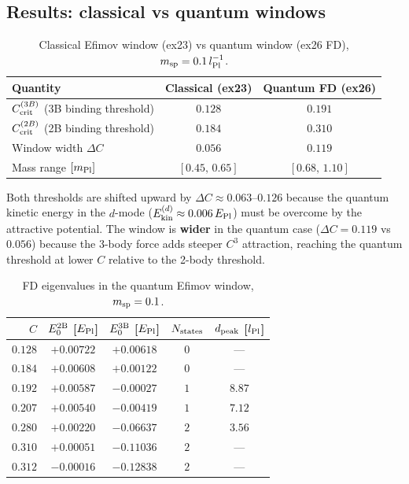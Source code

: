 \subsection{Results: classical vs quantum windows}

\begin{table}[h]
\centering
\caption{Classical Efimov window (ex23) vs quantum window (ex26 FD),
$m_{\rm sp}=0.1\,l_{\rm Pl}^{-1}$.}
\label{tab:qm_window}
\begin{tabular}{lcc}
\hline
Quantity & Classical (ex23) & Quantum FD (ex26) \\
\hline
$C_{\rm crit}^{(3B)}$ (3B binding threshold) & $0.128$ & $0.191$ \\
$C_{\rm crit}^{(2B)}$ (2B binding threshold) & $0.184$ & $0.310$ \\
Window width $\Delta C$ & $0.056$ & $\mathbf{0.119}$ \\
Mass range $[m_{\rm Pl}]$ & $[0.45,\,0.65]$ & $[0.68,\,1.10]$ \\
\hline
\end{tabular}
\end{table}

\noindent
Both thresholds are shifted upward by $\Delta C\approx0.063$--$0.126$
because the quantum kinetic energy in the $d$-mode
($E_{\rm kin}^{(d)}\approx0.006\,E_{\rm Pl}$) must be overcome by the
attractive potential.  The window is \textbf{wider} in the quantum case
($\Delta C=0.119$ vs $0.056$) because the 3-body force adds steeper
$C^3$ attraction, reaching the quantum threshold at lower $C$ relative
to the 2-body threshold.

\begin{table}[h]
\centering
\caption{FD eigenvalues in the quantum Efimov window, $m_{\rm sp}=0.1$.}
\label{tab:qm_eigs}
\begin{tabular}{rcccc}
\hline
$C$ & $E_0^{\rm 2B}$ [$E_{\rm Pl}$] & $E_0^{\rm 3B}$ [$E_{\rm Pl}$]
    & $N_{\rm states}$ & $d_{\rm peak}$ [$l_{\rm Pl}$] \\
\hline
$0.128$ & $+0.00722$ & $+0.00618$ & $0$ & --- \\
$0.184$ & $+0.00608$ & $+0.00122$ & $0$ & --- \\
$0.192$ & $+0.00587$ & $-0.00027$ & $1$ & $8.87$ \\
$0.207$ & $+0.00540$ & $-0.00419$ & $1$ & $7.12$ \\
$0.280$ & $+0.00220$ & $-0.06637$ & $2$ & $3.56$ \\
$0.310$ & $+0.00051$ & $-0.11036$ & $2$ & --- \\
$0.312$ & $-0.00016$ & $-0.12838$ & $2$ & --- \\
\hline
\end{tabular}
\end{table}

